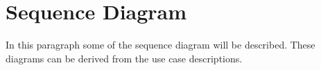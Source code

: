 \section{Sequence Diagram}
In this paragraph some of the sequence diagram will be described. These diagrams can be derived from the use case descriptions.





